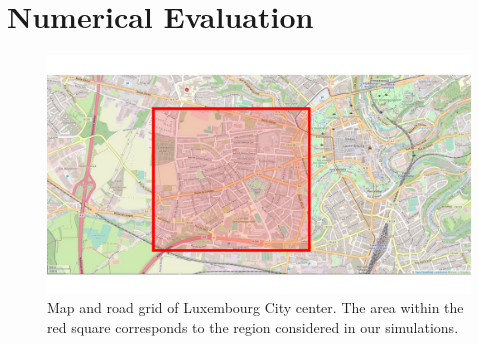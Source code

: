 \vspace{-0.15in}
\section{Numerical Evaluation}
\label{sec:Numerical Evaluation}
%
%
\begin{figure}[t!]
\centering
\includegraphics[width=1\columnwidth]{figures/lux_map_2.pdf}
\caption{Map and road grid of Luxembourg City center. The area within the red square corresponds to the region considered in our simulations.\vspace{-0.2in}}
\label{fig:luxCity}
\end{figure}

%

